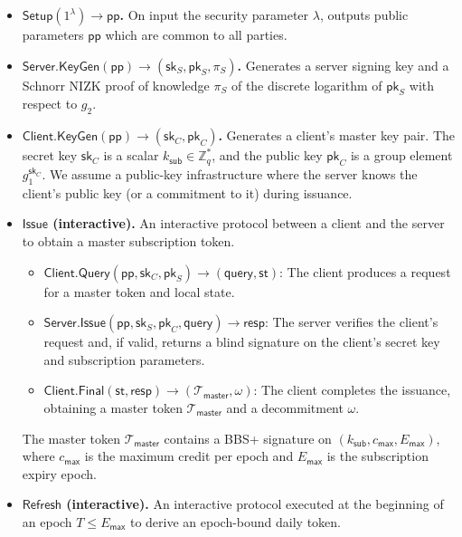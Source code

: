 \documentclass[11pt]{article}
\theoremstyle{definitionstyle}
\theoremstyle{plain}
\begin{document}
\begin{itemize}[leftmargin=*]
\item \textbf{$\mathsf{Setup}(1^\lambda) \to \mathsf{pp}$.} On input the security parameter $\lambda$, outputs public parameters $\mathsf{pp}$ which are common to all parties.
\item \textbf{$\mathsf{Server.KeyGen}(\mathsf{pp}) \to (\mathsf{sk}_S, \mathsf{pk}_S, \pi_S)$.} Generates a server signing key and a Schnorr NIZK proof of knowledge $\pi_S$ of the discrete logarithm of $\mathsf{pk}_S$ with respect to $g_2$.
\item \textbf{$\mathsf{Client.KeyGen}(\mathsf{pp}) \to (\mathsf{sk}_C, \mathsf{pk}_C)$.} Generates a client's master key pair. The secret key $\mathsf{sk}_C$ is a scalar $k_{\mathsf{sub}} \in \mathbb{Z}_q^*$, and the public key $\mathsf{pk}_C$ is a group element $g_1^{\mathsf{sk}_C}$. We assume a public-key infrastructure where the server knows the client's public key (or a commitment to it) during issuance.
\item \textbf{$\mathsf{Issue}$ (interactive).} An interactive protocol between a client and the server to obtain a master subscription token.
  \begin{itemize}
  \item $\mathsf{Client.Query}(\mathsf{pp}, \mathsf{sk}_C, \mathsf{pk}_S) \to (\mathsf{query}, \mathsf{st})$: The client produces a request for a master token and local state.
  \item $\mathsf{Server.Issue}(\mathsf{pp}, \mathsf{sk}_S, \mathsf{pk}_C, \mathsf{query}) \to \mathsf{resp}$: The server verifies the client's request and, if valid, returns a blind signature on the client's secret key and subscription parameters.
  \item $\mathsf{Client.Final}(\mathsf{st}, \mathsf{resp}) \to (\mathcal{T}_{\mathsf{master}}, \omega)$: The client completes the issuance, obtaining a master token $\mathcal{T}_{\mathsf{master}}$ and a decommitment $\omega$.
  \end{itemize}
  The master token $\mathcal{T}_{\mathsf{master}}$ contains a BBS+ signature on $(k_{\mathsf{sub}}, c_{\mathsf{max}}, E_{\mathsf{max}})$, where $c_{\mathsf{max}}$ is the maximum credit per epoch and $E_{\mathsf{max}}$ is the subscription expiry epoch.
\item \textbf{$\mathsf{Refresh}$ (interactive).} An interactive protocol executed at the beginning of an epoch $T \le E_{\mathsf{max}}$ to derive an epoch-bound daily token.
  \begin{itemize}

\end{itemize}
\end{itemize}
\end{document}
